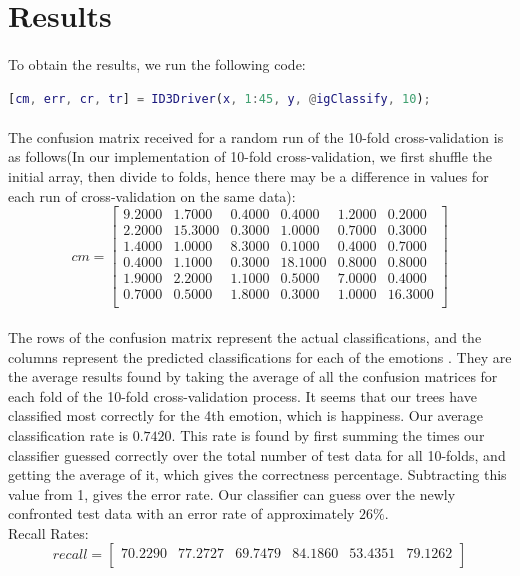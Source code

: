 \documentclass[a4paper,12pt,oneside,final]{report}
\begin{document}
\section{Results}
\paragraph{}
To obtain the results, we run the following code:
\newline
\begin{lstlisting}[language=MATLAB, frame=single]
[cm, err, cr, tr] = ID3Driver(x, 1:45, y, @igClassify, 10);
\end{lstlisting}
\paragraph{}
The confusion matrix received for a random run of the 10-fold cross-validation is as follows(In our implementation of 10-fold cross-validation, we first shuffle the initial array, then divide to folds, hence there may be a difference in values for each run of cross-validation on the same data):
\[
cm = \left[\begin{array}{cccccc}
9.2000  &  1.7000  &  0.4000  &  0.4000 &   1.2000    &0.2000 \\
    2.2000   &15.3000&    0.3000&    1.0000&    0.7000 &    0.3000 \\
    1.4000    &1.0000    &8.3000    &0.1000    &0.4000   & 0.7000 \\
    0.4000    &1.1000    &0.3000   &18.1000   & 0.8000   & 0.8000 \\
    1.9000    &2.2000    &1.1000    &0.5000    &7.0000    &0.4000 \\
    0.7000    &0.5000    &1.8000    &0.3000    &1.0000   &16.3000 \\

\end{array}
\right]
\]
\paragraph{}
The rows of the confusion matrix represent the actual classifications, and the columns represent the predicted classifications for each of the emotions .  They are the average results found by taking the average of all the confusion matrices for each fold of the 10-fold cross-validation process. It seems that our trees have classified most correctly for the 4th emotion, which is happiness. Our average classification rate is   $0.7420$. This rate is found by first summing the times our classifier guessed correctly over the total number of test data for  all 10-folds, and getting the average of it, which gives the correctness percentage. Subtracting this value from 1, gives the error rate. Our classifier can guess over the newly confronted test data with an error rate of approximately $26\%$.  \\
Recall Rates:
\[
recall = \left[\begin{array}{cccccc}
70.2290   &77.2727  & 69.7479  & 84.1860 &  53.4351&   79.1262 \\

\end{array}
\right]
\]
\end{document}
